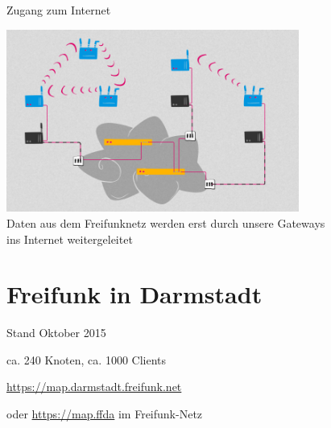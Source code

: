 \documentclass[10pt]{beamer}
\begin{document}
\begin{frame}{Zugang zum Internet}
	\begin{center}
		\includegraphics[height=6cm]{images/network_5} \\
		\vfill
		Daten aus dem Freifunknetz werden erst durch unsere Gateways\\ ins Internet weitergeleitet
	\end{center}
\end{frame}


\section{Freifunk in Darmstadt}

\begin{frame}{Stand Oktober 2015}
	\begin{center}
		\vfill
		ca. 240 Knoten, ca. 1000 Clients
		\begin{center}
		\end{center}
		
		\vfill
		\url{https://map.darmstadt.freifunk.net}
		
		\tiny oder \url{https://map.ffda} im Freifunk-Netz
	\end{center}	
\end{frame}
\end{document}

